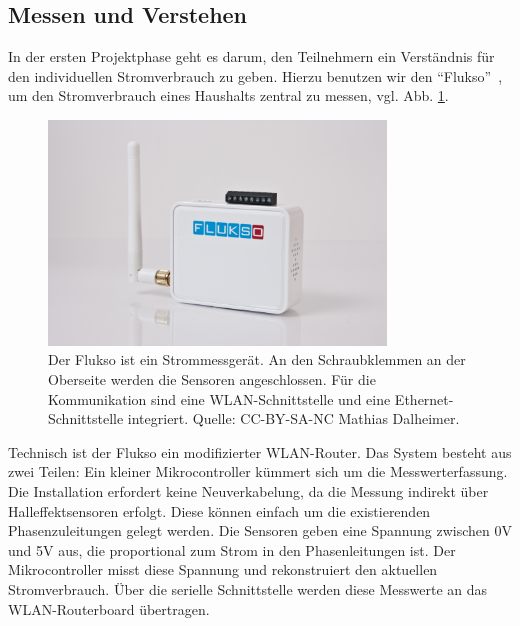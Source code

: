 \documentclass[logo]{fhgart}
\newcommand*\imgwidth{0.8\textwidth}
\begin{document}
\subsection{Messen und Verstehen}\label{sub:messenverstehen}

In der ersten Projektphase geht es darum, den Teilnehmern ein
Verständnis für den individuellen Stromverbrauch zu geben. Hierzu
benutzen wir den "`Flukso"'~\cite{web:flukso}, um den 
Stromverbrauch eines Haushalts zentral zu messen, vgl. 
Abb. \ref{fig:flukso}.
\begin{figure}[htbp]
  \begin{center}
    \includegraphics[width=\imgwidth]{figures/Flukso.jpg}
    \caption{Der Flukso ist ein Strommessgerät. An den Schraubklemmen
    an der Oberseite werden die Sensoren angeschlossen. Für die
    Kommunikation sind eine WLAN-Schnittstelle und eine
    Ethernet-Schnittstelle integriert. Quelle: CC-BY-SA-NC Mathias
    Dalheimer.}
    \label{fig:flukso}
  \end{center}
\end{figure}
Technisch ist der Flukso ein modifizierter WLAN-Router. Das System
besteht aus zwei Teilen: Ein kleiner Mikrocontroller kümmert sich um die
Messwerterfassung. Die Installation erfordert keine Neuverkabelung, da
die Messung indirekt über Halleffektsensoren erfolgt. Diese können
einfach um die existierenden Phasenzuleitungen gelegt werden. Die
Sensoren geben eine Spannung zwischen 0V und 5V aus, die proportional
zum Strom in den Phasenleitungen ist. Der Mikrocontroller misst diese
Spannung und rekonstruiert den aktuellen Stromverbrauch. Über die
serielle Schnittstelle werden diese Messwerte an das WLAN-Routerboard
übertragen. 
\end{document}
